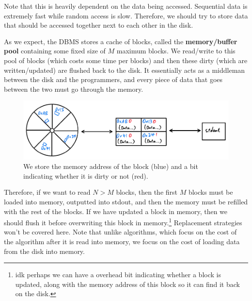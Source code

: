   Note that this is heavily dependent on the data being accessed. Sequential data is extremely fast while random access is slow. Therefore, we should try to store data that should be accessed together next to each other in the disk.  

  \begin{definition}
    As we expect, the DBMS stores a cache of blocks, called the \textbf{memory/buffer pool} containing some fixed size of $M$ maximum blocks. We read/write to this pool of blocks (which costs some time per blocks) and then these dirty (which are written/updated) are flushed back to the disk. It essentially acts as a middleman between the disk and the programmers, and every piece of data that goes between the two must go through the memory. 

    \begin{figure}[H]
      \centering 
      \includegraphics[scale=0.4]{img/disk_memory.png}
      \caption{We store the memory address of the block (blue) and a bit indicating whether it is dirty or not (red). } 
      \label{fig:disk_memory}
    \end{figure}
  \end{definition}

  Therefore, if we want to read $N > M$ blocks, then the first $M$ blocks must be loaded into memory, outputted into stdout, and then the memory must be refilled with the rest of the blocks. If we have updated a block in memory, then we should flush it before overwriting this block in memory.\footnote{idk perhaps we can have a overhead bit indicating whether a block is updated, along with the memory address of this block so it can find it back on the disk.} Replacement strategies won't be covered here. Note that unlike algorithms, which focus on the cost of the algorithm after it is read into memory, we focus on the cost of loading data from the disk into memory. 

